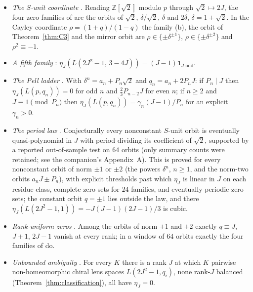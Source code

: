 \documentclass[11pt]{article}
\theoremstyle{definition}
\newcommand{\Z}{\mathbb Z}
\newcommand{\ind}{\mathbf 1}
\begin{document}
\begin{itemize}
\item \emph{The $S$-unit coordinate} \cite[Lem.~4.1,
Prop.~4.3]{SilverRankZeros2026}.  Reading $\Z[\sqrt2]$ modulo $p$
through $\sqrt2\mapsto2J$, the four zero families of
\cite[Thm.~7.1]{MahmoodP1Collection2026} are the orbits of $\sqrt2$,
$\delta/\sqrt2$, $\delta$ and $2\delta$, $\delta=1+\sqrt2$.  In the
Cayley coordinate $\rho=(1+q)/(1-q)$ the family (b), the orbit of
Theorem~\ref{thm:C3} and the mirror orbit are $\rho\in\{\pm\delta^{\pm1}\}$,
$\rho\in\{\pm\delta^{\pm2}\}$ and $\rho^2\equiv-1$.
\item \emph{A fifth family} \cite[Thm.~5.1]{SilverRankZeros2026}:
$\eta_J(L(2J^2-1,\,3-4J))=(J-1)\ind_{J\text{ odd}}$.
\item \emph{The Pell ladder} \cite[Thm.~6.1]{SilverRankZeros2026}.  With
$\delta^n=a_n+P_n\sqrt2$ and $q_n=a_n+2P_nJ$: if $P_n\mid J$ then
$\eta_J(L(p,q_n))=0$ for odd $n$ and $\frac23P_{n-2}J$ for even $n$; if
$n\geq2$ and $J\equiv1\pmod{P_n}$ then $\eta_J(L(p,q_n))=\gamma_n(J-1)/P_n$
for an explicit $\gamma_n>0$.
\item \emph{The period law} \cite[Conj.~7.1, Thm.~8.4,
Cor.~8.5]{SilverRankZeros2026}.  Conjecturally every nonconstant $S$-unit orbit is
eventually quasi-polynomial in $J$ with period dividing its coefficient
of $\sqrt2$, supported by a reported out-of-sample test on $64$ orbits
(only summary counts were retained; see the companion's Appendix~A).
This is proved for every nonconstant orbit of norm $\pm1$ or
$\pm2$ (the powers $\delta^n$, $n\geq1$, and the norm-two orbits
$a_nJ\pm P_n$), with explicit thresholds past which $\eta_J$ is linear in
$J$ on each residue class, complete zero sets for $24$ families, and
eventually periodic zero sets; the constant orbit $q=\pm1$ lies outside
the law, and there $\eta_J(L(2J^2-1,1))=-J(J-1)(2J-1)/3$ is cubic.
\item \emph{Rank-uniform zeros} \cite[Cor.~8.9,
Cor.~7.2(a)]{SilverRankZeros2026}.  Among the orbits of norm $\pm1$ and
$\pm2$ exactly $q\equiv J$, $J+1$, $2J-1$ vanish at every rank; in a
window of $64$ orbits exactly the four families of
\cite{MahmoodP1Collection2026} do.
\item \emph{Unbounded ambiguity} \cite[Cor.~8.13]{SilverRankZeros2026}.
For every $K$ there is a rank $J$ at which $K$ pairwise non-homeomorphic
chiral lens spaces $L(2J^2-1,q_i)$, none rank-$J$ balanced
(Theorem~\ref{thm:classification}), all have $\eta_J=0$.
\end{itemize}
\end{document}

